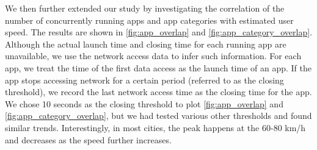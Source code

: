 We then further extended our study by investigating the correlation of the number of concurrently running apps and app categories with estimated user speed. The results are shown in \autoref{fig:app_overlap} and \autoref{fig:app_category_overlap}. %
Although the actual launch time and closing time for each running app are unavailable, we use the network access data to infer such information. For each app, we treat the time of the first data access as the launch time of an app. If the app stops accessing network for a certain period (referred to as the closing threshold), we record the last network access time as the closing time for the app. We chose 10 seconds as the closing threshold to plot
\autoref{fig:app_overlap} and \autoref{fig:app_category_overlap}, 
but we had tested various other thresholds and found similar trends. Interestingly, in most cities, the peak happens at the 60-80 km/h and decreases as the speed further increases. 

